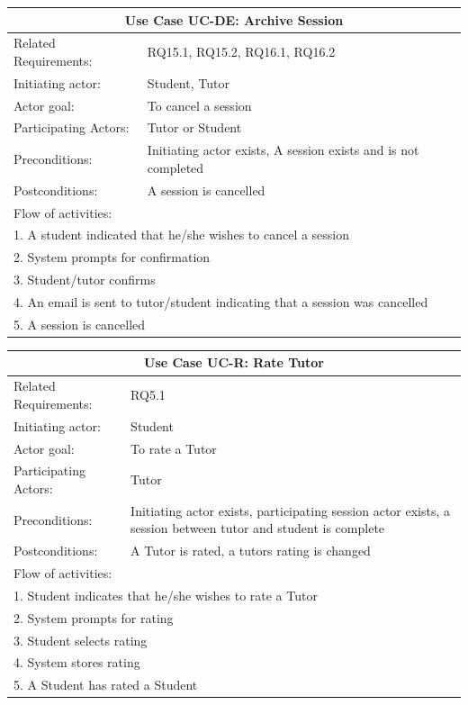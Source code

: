 \documentclass[12pt]{article}
\begin{document}
{    \begin{tabular}{| l | p{10cm}| }
			\hline\multicolumn{2}{|c|}{ \textbf{Use Case UC-DE: Archive Session} }\\ \hline
			Related Requirements: &  RQ15.1, RQ15.2, RQ16.1, RQ16.2\\ \hline
			Initiating actor: & Student, Tutor \\ \hline
			Actor goal: & To cancel a session\\ \hline
			Participating Actors: & Tutor or Student\\ \hline
			Preconditions: &Initiating actor exists, A session exists and is not completed\\ \hline
			Postconditions: & A session is cancelled\\ \hline
			\multicolumn{2}{|l|}{Flow of activities:}\\ \hline
			\multicolumn{2}{|p{15cm}|}{1. A student indicated that he/she wishes to cancel a session}\\
			\multicolumn{2}{|p{15cm}|}{2. System prompts for confirmation}\\
			\multicolumn{2}{|l|}{3. Student/tutor confirms}\\
			\multicolumn{2}{|l|}{4. An email is sent to tutor/student indicating that a session was cancelled}\\
			\multicolumn{2}{|l|}{5. A session is cancelled}\\
			 \hline
		\end{tabular}



    \begin{tabular}{| l | p{10cm}| }
      \hline\multicolumn{2}{|c|}{ \textbf{Use Case UC-R: Rate Tutor} }\\ \hline
      Related Requirements: &  RQ5.1\\ \hline
      Initiating actor: & Student \\ \hline
      Actor goal: & To rate a Tutor\\ \hline
      Participating Actors: &Tutor\\ \hline
      Preconditions: &Initiating actor exists, participating session actor exists, a session between  tutor and student is complete\\ \hline
      Postconditions: & A Tutor is rated, a tutors rating is changed\\ \hline
      \multicolumn{2}{|l|}{Flow of activities:}\\ \hline
      \multicolumn{2}{|p{15cm}|}{1. Student indicates that he/she wishes to rate a Tutor}\\
      \multicolumn{2}{|p{15cm}|}{2. System prompts for rating}\\
      \multicolumn{2}{|l|}{3. Student selects rating}\\
      \multicolumn{2}{|l|}{4. System stores rating}\\
      \multicolumn{2}{|l|}{5. A Student has rated a Student}\\
       \hline
    \end{tabular}

}
\end{document}
